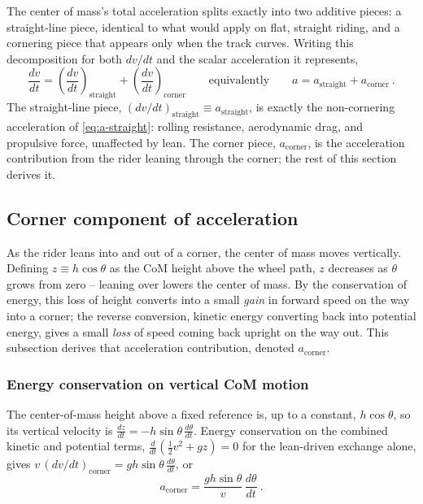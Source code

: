 The center of mass's total acceleration splits exactly into two additive
pieces: a straight-line piece, identical to what would apply on flat, straight
riding, and a cornering piece that appears only when the track curves.
Writing this decomposition for both $dv/dt$ and the scalar acceleration it
represents,
\begin{equation}
    \frac{dv}{dt} = \left(\frac{dv}{dt}\right)_{\text{straight}} + \left(\frac{dv}{dt}\right)_{\text{corner}}
    \qquad\text{equivalently}\qquad
    a = a_{\mathrm{straight}} + a_{\mathrm{corner}}\ .
    \label{eq:accel-split}
\end{equation}
The straight-line piece, $(dv/dt)_{\text{straight}} \equiv a_{\mathrm{straight}}$,
is exactly the non-cornering acceleration of \cref{eq:a-straight}: rolling
resistance, aerodynamic drag, and propulsive force, unaffected by lean. The
corner piece, $a_{\mathrm{corner}}$, is the acceleration contribution from the
rider leaning through the corner; the rest of this section derives it.

\subsection{Corner component of acceleration}
\label{sec:energy-feedback}

As the rider leans into and out of a corner, the center of mass moves
vertically. Defining $z \equiv h\cos\theta$ as the CoM height above the wheel path,
$z$ decreases as $\theta$ grows from zero -- leaning over lowers the
center of mass. By the conservation of energy, this loss of height converts
into a small \emph{gain} in forward speed on the way into a corner; the reverse
conversion, kinetic energy converting back into potential energy, gives a small
\emph{loss} of speed coming back upright on the way out. This subsection derives
that acceleration contribution, denoted $a_{\mathrm{corner}}$.

\subsubsection{Energy conservation on vertical CoM motion}

The center-of-mass height above a fixed reference is, up to a constant,
$h\cos\theta$, so its vertical velocity is
$\frac{dz}{dt} = -h\sin\theta\,\frac{d\theta}{dt}$. Energy conservation on the
combined kinetic and potential terms, $\frac{d}{dt}\!\left(\tfrac{1}{2}v^2 + gz\right) = 0$
for the lean-driven exchange alone, gives
$v\,(dv/dt)_{\text{corner}} = gh\sin\theta\,\frac{d\theta}{dt}$,
or
\begin{equation}
    a_{\mathrm{corner}} = \frac{gh\sin\theta}{v}\,\frac{d\theta}{dt}\ .
    \label{eq:a-corner-general}
\end{equation}

